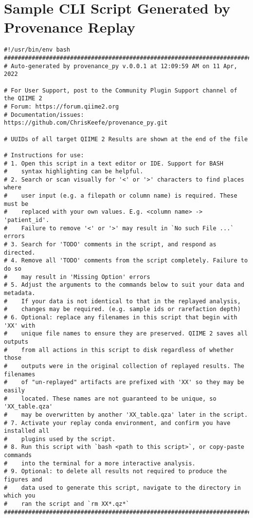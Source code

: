\chapter{Sample CLI Script Generated by Provenance Replay}
\label{app:CLIScript}

\begin{footnotesize}
\begin{verbatim}
#!/usr/bin/env bash
###############################################################################
# Auto-generated by provenance_py v.0.0.1 at 12:09:59 AM on 11 Apr, 2022

# For User Support, post to the Community Plugin Support channel of the QIIME 2
# Forum: https://forum.qiime2.org
# Documentation/issues: https://github.com/ChrisKeefe/provenance_py.git

# UUIDs of all target QIIME 2 Results are shown at the end of the file

# Instructions for use:
# 1. Open this script in a text editor or IDE. Support for BASH
#    syntax highlighting can be helpful.
# 2. Search or scan visually for '<' or '>' characters to find places where
#    user input (e.g. a filepath or column name) is required. These must be
#    replaced with your own values. E.g. <column name> -> 'patient_id'.
#    Failure to remove '<' or '>' may result in `No such File ...` errors
# 3. Search for 'TODO' comments in the script, and respond as directed.
# 4. Remove all 'TODO' comments from the script completely. Failure to do so
#    may result in 'Missing Option' errors
# 5. Adjust the arguments to the commands below to suit your data and metadata.
#    If your data is not identical to that in the replayed analysis,
#    changes may be required. (e.g. sample ids or rarefaction depth)
# 6. Optional: replace any filenames in this script that begin with 'XX' with
#    unique file names to ensure they are preserved. QIIME 2 saves all outputs
#    from all actions in this script to disk regardless of whether those
#    outputs were in the original collection of replayed results. The filenames
#    of "un-replayed" artifacts are prefixed with 'XX' so they may be easily
#    located. These names are not guaranteed to be unique, so 'XX_table.qza'
#    may be overwritten by another 'XX_table.qza' later in the script.
# 7. Activate your replay conda environment, and confirm you have installed all
#    plugins used by the script.
# 8. Run this script with `bash <path to this script>`, or copy-paste commands
#    into the terminal for a more interactive analysis.
# 9. Optional: to delete all results not required to produce the figures and
#    data used to generate this script, navigate to the directory in which you
#    ran the script and `rm XX*.qz*`
###############################################################################


\end{verbatim}
\end{footnotesize}

